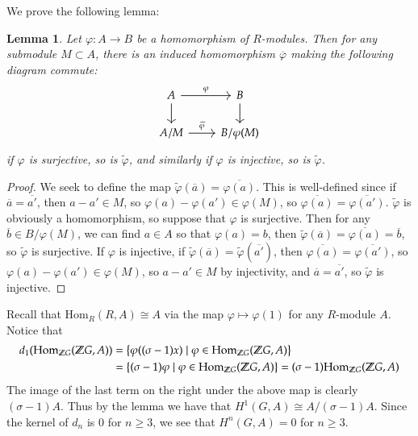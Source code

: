 \documentclass[12pt]{article}
\newtheorem{lemma}{Lemma}
\theoremstyle{definitionstyle}
\def\mbb#1{\mathbb{#1}}
\def\cph{\varphi}
\newcommand{\SET}[1]{\Set{\mskip-\medmuskip #1 \mskip-\medmuskip}}
\newcommand{\Z}{\mbb Z}
\newcommand{\Hom}{\mathrm{Hom}}
\begin{document}
\begin{enumerate}[label=(\alph*)]
        We prove the following lemma:
        \begin{lemma}
            Let $\cph: A \to B$ be a homomorphism of $R$-modules. Then for any submodule $M \subset A$, there is an induced homomorphism $\overline \cph$ making the following diagram commute:
            \[\begin{tikzcd}
                A & B \\
                {A/M} & {B/\cph(M)}
                \arrow["\cph", from=1-1, to=1-2]
                \arrow[from=1-1, to=2-1]
                \arrow[from=1-2, to=2-2]
                \arrow["{\widetilde \cph}", from=2-1, to=2-2]
            \end{tikzcd}\]
            if $\cph$ is surjective, so is $\widetilde \cph$, and similarly if $\cph$ is injective, so is $\widetilde \cph$.
        \end{lemma}
        \begin{proof}
            We seek to define the map $\widetilde \cph(\overline a) = \overline{\cph(a)}$. This is well-defined since if $\overline a = \overline{a'}$, then $a - a' \in M$, so $\cph(a) - \cph(a') \in \cph(M)$, so $\overline{\cph(a)} = \overline{\cph(a')}$. $\widetilde \cph$ is obviously a homomorphism, so suppose that $\cph$ is surjective. Then for any $\overline b \in B/\cph(M)$, we can find $a \in A$ so that $\cph(a) = b$, then $\widetilde \cph(\overline a) = \overline{\cph(a)} = \overline b$, so $\widetilde \cph$ is surjective. If $\cph$ is injective, if $\widetilde \cph(\overline a) = \widetilde \cph(\overline{a'})$, then $\overline{\cph(a)} = \overline{\cph(a')}$, so $\cph(a) - \cph(a') \in \cph(M)$, so $a - a' \in M$ by injectivity, and $\overline a = \overline{a'}$, so $\widetilde \cph$ is injective.
        \end{proof}
        Recall that $\Hom_R(R, A) \cong A$ via the map $\cph \mapsto \cph(1)$ for any $R$-module $A$. Notice that 
        \begin{align*}
            d_1(\Hom_{\Z G}(\Z G, A)) &= \SET{\cph((\sigma-1)x) \mid \cph \in \Hom_{\Z G}(\Z G, A)} 
            \\&= \SET{(\sigma-1)\cph \mid \cph \in \Hom_{\Z G}(\Z G, A)} = (\sigma-1)\Hom_{\Z G}(\Z G, A)
        \end{align*}
        The image of the last term on the right under the above map is clearly $(\sigma-1)A$. Thus by the lemma we have that $H^1(G, A) \cong A/(\sigma-1)A$. Since the kernel of $d_n$ is 0 for $n \geq 3$, we see that $H^n(G, A) = 0$ for $n \geq 3$.
    \end{enumerate}
\end{document}
